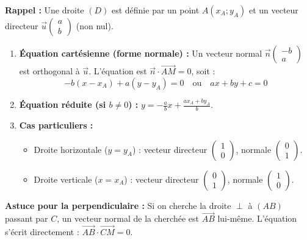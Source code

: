 \documentclass[11pt]{article}
\begin{document}
\begin{methode}
    \textbf{Rappel :} Une droite $(D)$ est définie par un point $A(x_A;y_A)$ et un vecteur directeur $\vec{u}\begin{pmatrix} a \\ b \end{pmatrix}$ (non nul).
    \begin{enumerate}
        \item \textbf{Équation cartésienne (forme normale) :} Un vecteur normal $\vec{n}\begin{pmatrix} -b \\ a \end{pmatrix}$ est orthogonal à $\vec{u}$. L'équation est $\vec{n}\cdot\overrightarrow{AM}=0$, soit :
        \[
        -b(x-x_A) + a(y-y_A) = 0 \quad \text{ou} \quad ax + by + c = 0
        \]
        \item \textbf{Équation réduite (si $b\neq 0$) :} $y = -\frac{a}{b}x + \frac{ax_A+by_A}{b}$.
        \item \textbf{Cas particuliers :}
            \begin{itemize}
                \item Droite horizontale ($y=y_A$) : vecteur directeur $\begin{pmatrix} 1 \\ 0 \end{pmatrix}$, normale $\begin{pmatrix} 0 \\ 1 \end{pmatrix}$.
                \item Droite verticale ($x=x_A$) : vecteur directeur $\begin{pmatrix} 0 \\ 1 \end{pmatrix}$, normale $\begin{pmatrix} 1 \\ 0 \end{pmatrix}$.
            \end{itemize}
    \end{enumerate}
    \textbf{Astuce pour la perpendiculaire :} Si on cherche la droite $\perp$ à $(AB)$ passant par $C$, un vecteur normal de la cherchée est $\overrightarrow{AB}$ lui-même. L'équation s'écrit directement : $\overrightarrow{AB}\cdot\overrightarrow{CM}=0$.
\end{methode}
\end{document}
